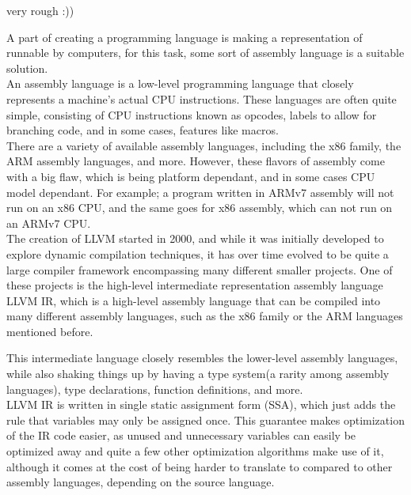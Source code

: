 very rough :))

A part of creating a programming language is making a representation of runnable by computers,
for this task, some sort of assembly language is a suitable solution.
\\

An assembly language is a low-level programming language that closely represents a machine's actual 
CPU instructions. These languages are often quite simple, consisting of CPU instructions known as opcodes,
labels to allow for branching code, and in some cases, features like macros.
\\

There are a variety of available assembly languages, including the x86 family, the ARM assembly languages, and more.
However, these flavors of assembly come with a big flaw, which is being platform dependant, and in some cases 
CPU model dependant. For example; a program written in ARMv7 assembly will not run on an x86 CPU, and the same goes
for x86 assembly, which can not run on an ARMv7 CPU.
\\

The creation of LLVM started in 2000, and while it was initially developed to explore dynamic compilation techniques, 
it has over time evolved to be quite a large compiler framework encompassing many different smaller projects.
One of these projects is the high-level intermediate representation assembly language LLVM IR, which is a 
high-level assembly language that can be compiled into many different assembly languages, 
such as the x86 family or the ARM languages mentioned before.

This intermediate language closely resembles the lower-level assembly languages, while also shaking things up
by having a type system(a rarity among assembly languages), type declarations, function definitions, and more.
\\

LLVM IR is written in single static assignment form (SSA), which just adds the rule that variables may only 
be assigned once. This guarantee makes optimization of the IR code easier, as unused and unnecessary variables
can easily be optimized away and quite a few other optimization algorithms make use of it,
although it comes at the cost of being harder to translate to compared to other assembly languages, depending on
the source language.
